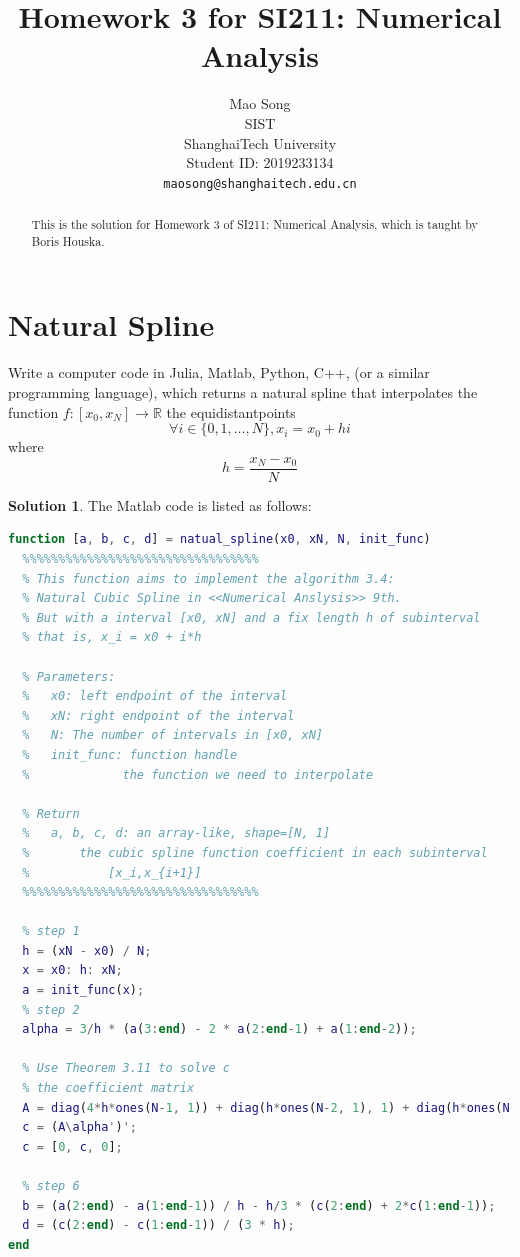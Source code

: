 \documentclass{article}
\title{Homework 3 for SI211: Numerical Analysis}
\author{%
  {Mao Song} \\
  SIST\\
  ShanghaiTech University\\
  Student ID: 2019233134 \\
  \texttt{maosong@shanghaitech.edu.cn} \\
}
\theoremstyle{definition}
\newtheorem{solution}{Solution}
\begin{document}
\maketitle

\begin{abstract}
  This is the solution for Homework 3 of SI211: Numerical Analysis, which is taught by Boris Houska.
\end{abstract}

\section{Natural Spline}
Write a computer code in Julia, Matlab, Python, C++, (or a similar programming language), which returns a natural spline that  interpolates the function $f:[x_0, x_N]\to\mathbb{R}$ the equidistantpoints
\begin{equation}
	\forall i\in\{0,1,\dots,N\},x_i=x_0+hi
\end{equation}
where 
\begin{equation}
	h = \frac{x_N-x_0}{N}
\end{equation}
\begin{solution}
  	The Matlab code is listed as follows:
  	\begin{lstlisting}[language=Matlab]
function [a, b, c, d] = natual_spline(x0, xN, N, init_func)
  %%%%%%%%%%%%%%%%%%%%%%%%%%%%%%%%%
  % This function aims to implement the algorithm 3.4:
  % Natural Cubic Spline in <<Numerical Anslysis>> 9th.
  % But with a interval [x0, xN] and a fix length h of subinterval
  % that is, x_i = x0 + i*h

  % Parameters:
  %   x0: left endpoint of the interval
  %   xN: right endpoint of the interval
  %   N: The number of intervals in [x0, xN]
  %   init_func: function handle
  %             the function we need to interpolate

  % Return
  %   a, b, c, d: an array-like, shape=[N, 1]
  %       the cubic spline function coefficient in each subinterval 
  %           [x_i,x_{i+1}]
  %%%%%%%%%%%%%%%%%%%%%%%%%%%%%%%%%

  % step 1
  h = (xN - x0) / N;
  x = x0: h: xN;
  a = init_func(x);
  % step 2
  alpha = 3/h * (a(3:end) - 2 * a(2:end-1) + a(1:end-2));

  % Use Theorem 3.11 to solve c
  % the coefficient matrix
  A = diag(4*h*ones(N-1, 1)) + diag(h*ones(N-2, 1), 1) + diag(h*ones(N-2, 1), -1);
  c = (A\alpha')';
  c = [0, c, 0];

  % step 6
  b = (a(2:end) - a(1:end-1)) / h - h/3 * (c(2:end) + 2*c(1:end-1));
  d = (c(2:end) - c(1:end-1)) / (3 * h);
end
\end{lstlisting}
\end{solution}
\end{document}
